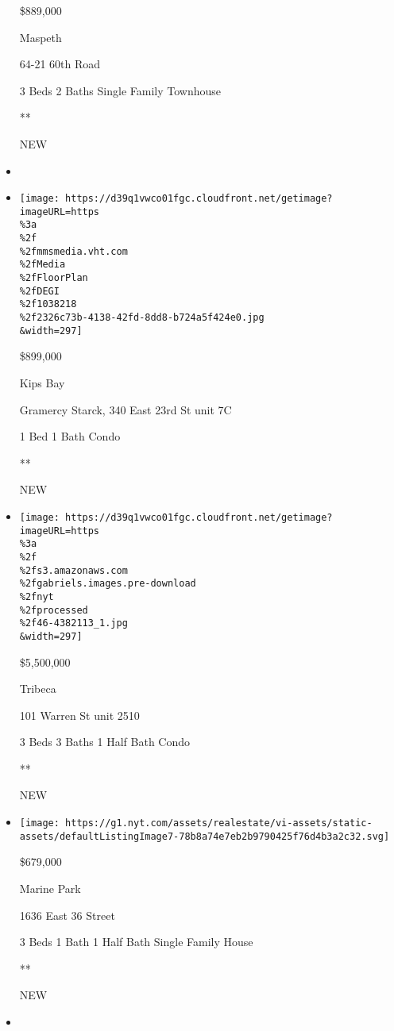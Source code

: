 \begin{itemize}
  \$889,000

  Maspeth

  64-21 60th Road

  3 Beds \textbar{} 2 Baths \textbar{} Single Family Townhouse

  **

  NEW
\item
\item
  \href{/real-estate/usa/ny/new-york/kips-bay/homes-for-sale/gramercy-starck-340-east-23rd-st/46-4381885?}{}

  \texttt{[image: https://d39q1vwco01fgc.cloudfront.net/getimage?imageURL=https\\\%3a\\\%2f\\\%2fmmsmedia.vht.com\\\%2fMedia\\\%2fFloorPlan\\\%2fDEGI\\\%2f1038218\\\%2f2326c73b-4138-42fd-8dd8-b724a5f424e0.jpg\\\&width=297]}

  \$899,000

  Kips Bay

  Gramercy Starck, 340 East 23rd St unit 7C

  1 Bed \textbar{} 1 Bath \textbar{} Condo

  **

  NEW
\item
  \href{/real-estate/usa/ny/new-york/tribeca/homes-for-sale/101-warren-st/46-4382113?}{}

  \texttt{[image: https://d39q1vwco01fgc.cloudfront.net/getimage?imageURL=https\\\%3a\\\%2f\\\%2fs3.amazonaws.com\\\%2fgabriels.images.pre-download\\\%2fnyt\\\%2fprocessed\\\%2f46-4382113\_1.jpg\\\&width=297]}

  \$5,500,000

  Tribeca

  101 Warren St unit 2510

  3 Beds \textbar{} 3 Baths \textbar{} 1 Half Bath \textbar{} Condo

  **

  NEW
\item
  \href{/real-estate/usa/ny/brooklyn/marine-park/homes-for-sale/1636-east-36-street/15101-5537237?}{}

  \texttt{[image: https://g1.nyt.com/assets/realestate/vi-assets/static-assets/defaultListingImage7-78b8a74e7eb2b9790425f76d4b3a2c32.svg]}

  \$679,000

  Marine Park

  1636 East 36 Street

  3 Beds \textbar{} 1 Bath \textbar{} 1 Half Bath \textbar{} Single
  Family House

  **

  NEW
\item
  \href{/real-estate/usa/ny/brooklyn/park-slope/homes-for-sale/25-plaza-street-west/390-PRCH-2986451?}{}


\end{itemize}
